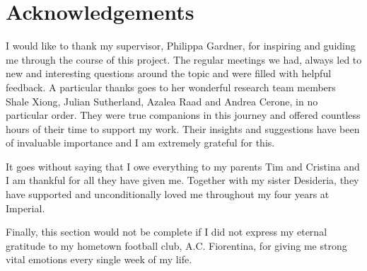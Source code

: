 \vspace*{\fill}
	\section*{Acknowledgements}
	
	I would like to thank my supervisor, Philippa Gardner, for inspiring and guiding me through the course of this project. The regular meetings we had, always led to new and interesting questions around the topic and were filled with helpful feedback. A particular thanks goes to her wonderful research team members Shale Xiong, Julian Sutherland, Azalea Raad and Andrea Cerone, in no particular order. They were true companions in this journey and offered countless hours of their time to support my work. Their insights and suggestions have been of invaluable importance and I am extremely grateful for this.
	
	It goes without saying that I owe everything to my parents Tim and Cristina and I am thankful for all they have given me. Together with my sister Desideria, they have supported and unconditionally loved me throughout my four years at Imperial.
	
	Finally, this section would not be complete if I did not express my eternal gratitude to my hometown football club, A.C. Fiorentina, for giving me strong vital emotions every single week of my life.
\vspace*{\fill}